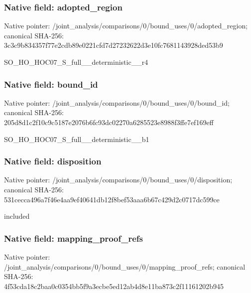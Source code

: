 \documentclass[10pt,a4paper]{article}
\begin{document}
\subsubsection{Native field: adopted\_\allowbreak{}region}
Native pointer: /joint\_\allowbreak{}analysis/comparisons/0/bound\_\allowbreak{}uses/0/adopted\_\allowbreak{}region; canonical SHA-256: 3c3c9b834357f77e2cdb89e0221cfd7d27232622d3e10fc7681143928ded53b9

\begingroup\raggedright\sloppy SO\_\allowbreak{}HO\_\allowbreak{}HOC07\_\allowbreak{}S\_\allowbreak{}full\_\allowbreak{}\_\allowbreak{}deterministic\_\allowbreak{}\_\allowbreak{}r4\par\endgroup

\subsubsection{Native field: bound\_\allowbreak{}id}
Native pointer: /joint\_\allowbreak{}analysis/comparisons/0/bound\_\allowbreak{}uses/0/bound\_\allowbreak{}id; canonical SHA-256: 205d8d1c2f10c9c5187e2076b6fc93dc02270a6285523e8988f3ffe7ef169eff

\begingroup\raggedright\sloppy SO\_\allowbreak{}HO\_\allowbreak{}HOC07\_\allowbreak{}S\_\allowbreak{}full\_\allowbreak{}\_\allowbreak{}deterministic\_\allowbreak{}\_\allowbreak{}b1\par\endgroup

\subsubsection{Native field: disposition}
Native pointer: /joint\_\allowbreak{}analysis/comparisons/0/bound\_\allowbreak{}uses/0/disposition; canonical SHA-256: 531cecca496a7f46e4aa9ef40641db12f8bef53aaa6b67c429d2c0717dc599ce

\begingroup\raggedright\sloppy included\par\endgroup

\subsubsection{Native field: mapping\_\allowbreak{}proof\_\allowbreak{}refs}
Native pointer: /joint\_\allowbreak{}analysis/comparisons/0/bound\_\allowbreak{}uses/0/mapping\_\allowbreak{}proof\_\allowbreak{}refs; canonical SHA-256: 4f53cda18c2baa0c0354bb5f9a3ecbe5ed12ab4d8e11ba873c2f11161202b945
\end{document}
